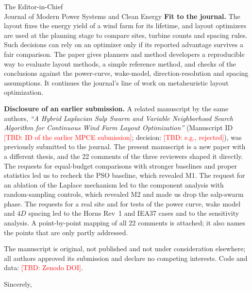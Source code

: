 \documentclass[11pt]{letter}
\newcommand{\TBD}[1]{\textcolor{red}{[TBD: #1]}}
\newcommand{\Journal}{Journal of Modern Power Systems and Clean Energy}
\newcommand{\JournalEditor}{The Editor-in-Chief}
\begin{document}
\begin{letter}{\JournalEditor\\\Journal}
\textbf{Fit to the journal.} The layout fixes the energy yield of a wind farm for its lifetime, and layout optimizers are used at the planning stage to compare sites, turbine counts and spacing rules. Such decisions can rely on an optimizer only if its reported advantage survives a fair comparison. The paper gives planners and method developers a reproducible way to evaluate layout methods, a simple reference method, and checks of the conclusions against the power-curve, wake-model, direction-resolution and spacing assumptions. It continues the journal's line of work on metaheuristic layout optimization.

\textbf{Disclosure of an earlier submission.} A related manuscript by the same authors, \textit{``A Hybrid Laplacian Salp Swarm and Variable Neighborhood Search Algorithm for Continuous Wind Farm Layout Optimization''} (Manuscript ID \TBD{ID of the earlier MPCE submission}; decision: \TBD{e.g., rejected}), was previously submitted to the journal. The present manuscript is a new paper with a different thesis, and the 22 comments of the three reviewers shaped it directly. The requests for equal-budget comparisons with stronger baselines and proper statistics led us to recheck the PSO baseline, which revealed M1. The request for an ablation of the Laplace mechanism led to the component analysis with random-sampling controls, which revealed M2 and made us drop the salp-swarm phase. The requests for a real site and for tests of the power curve, wake model and $4D$ spacing led to the Horns Rev~1 and IEA37 cases and to the sensitivity analysis. A point-by-point mapping of all 22 comments is attached; it also names the points that are only partly addressed.

The manuscript is original, not published and not under consideration elsewhere; all authors approved its submission and declare no competing interests. Code and data: \TBD{Zenodo DOI}.

\closing{Sincerely,}
\end{letter}
\end{document}
